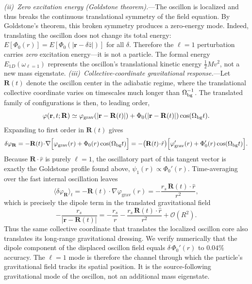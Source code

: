 \documentclass[aps,prd,onecolumn,superscriptaddress,nofootinbib,showpacs,12pt,notitlepage]{revtex4-2}
\renewcommand{\order}[1]{\mathcal{O}\!\left(#1\right)}
\begin{document}
\textit{(ii)~Zero excitation energy (Goldstone theorem).}---The
oscillon is localized and thus breaks the continuous translational
symmetry of the field equation.  By Goldstone's theorem, this
broken symmetry produces a zero-energy mode.  Indeed, translating
the oscillon does not change its total energy:
$E[\Phi_0(r)] = E[\Phi_0(|\mathbf{r} - \delta\hat{z}|)]$ for all
$\delta$.  Therefore the $\ell = 1$ perturbation carries
\emph{zero} excitation energy---it is not a particle.
The formal energy $E_{1D}(\omega_{\ell=1})$ represents the
oscillon's translational kinetic energy $\tfrac{1}{2}Mv^2$,
not a new mass eigenstate.
\textit{(iii)~Collective-coordinate gravitational response.}---Let
$\mathbf{R}(t)$ denote the oscillon center in the adiabatic
regime, where the translational collective coordinate varies on
timescales much longer than $\Omega_{\rm bg}^{-1}$.  The
translated family of configurations is then, to leading order,
\begin{equation}
  \varphi(\mathbf{r},t;\mathbf{R})
  \simeq \varphi_{\mathrm{grav}}(|\mathbf{r}-\mathbf{R}(t)|)
  + \Phi_0(|\mathbf{r}-\mathbf{R}(t)|)\cos(\Omega_{\rm bg} t).
\end{equation}
Expanding to first order in $\mathbf{R}(t)$ gives
\begin{equation}
  \delta\varphi_{\mathbf{R}}
  = -\mathbf{R}(t)\!\cdot\!\nabla
    \Bigl[\varphi_{\mathrm{grav}}(r)
    + \Phi_0(r)\cos(\Omega_{\rm bg} t)\Bigr]
  = -\bigl(\mathbf{R}(t)\!\cdot\!\hat{r}\bigr)
    \Bigl[\varphi_{\mathrm{grav}}'(r)
    + \Phi_0'(r)\cos(\Omega_{\rm bg} t)\Bigr].
\end{equation}
Because $\mathbf{R}\!\cdot\!\hat{r}$ is purely $\ell = 1$, the
oscillatory part of this tangent vector is exactly the
Goldstone profile found above, $\psi_1(r)\propto \Phi_0'(r)$.
Time-averaging over the fast internal oscillation leaves
\begin{equation}
  \langle\delta\varphi_{\mathbf{R}}\rangle_t
  = -\mathbf{R}(t)\!\cdot\!\nabla\varphi_{\mathrm{grav}}(r)
  = -\frac{r_s\,\mathbf{R}(t)\!\cdot\!\hat{r}}{r^2},
\end{equation}
which is precisely the dipole term in the translated
gravitational field
\begin{equation}
  -\frac{r_s}{|\mathbf{r}-\mathbf{R}(t)|}
  = -\frac{r_s}{r}
  - \frac{r_s\,\mathbf{R}(t)\!\cdot\!\hat{r}}{r^2}
  + \order{R^2}.
\end{equation}
Thus the same collective coordinate that translates the
localized oscillon core also translates its long-range
gravitational dressing.  We verify numerically that the dipole
component of the displaced oscillon field equals
$\delta\,\Phi_0'(r)$ to $0.04\%$ accuracy.  The $\ell = 1$ mode
is therefore the channel through which the particle's
gravitational field tracks its spatial position.  It is the
source-following gravitational mode of the oscillon, not an
additional mass eigenstate.
\end{document}
